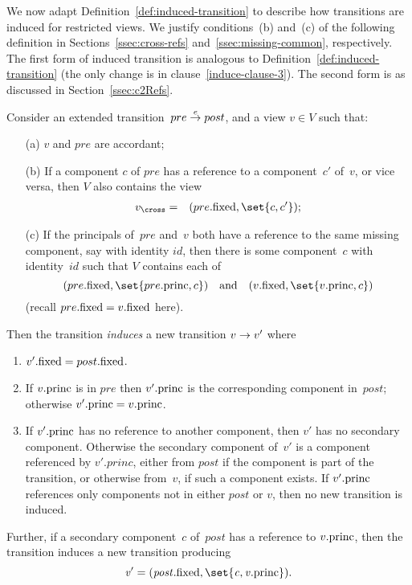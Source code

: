 We now adapt Definition~\ref{def:induced-transition} to describe how
transitions are induced for restricted views.  We justify conditions~(b)
and~(c) of the following definition in Sections~\ref{ssec:cross-refs}
and~\ref{ssec:missing-common}, respectively.  The first form of induced
transition is analogous to Definition~\ref{def:induced-transition} (the only
change is in clause~\ref{induce-clause-3}).  The second form is as discussed
in Section~\ref{ssec:c2Refs}.
%
\begin{definition}
\label{def:induced-transition-singleRef}
Consider an extended transition~$pre \stackrel{e}\rightarrow post$, and a view $v \in V$
such that:
%
\begin{enumerate}
\item[(a)] $v$ and $pre$ are accordant;

\item[(b)] If a component $c$ of $pre$ has a reference
  to a component~$c'$ of~$v$, or vice versa, then $V$ also contains the view
\begin{eqnarray*}
v_\cross & = & (pre.\fixed, \set{c, c'});
\end{eqnarray*}

\item[(c)] If the principals of~$pre$ and~$v$ both have a reference to the
  same missing component, say with identity $id$, then there is some
  component~$c$ with identity~$id$ such that $V$ contains each of
\[
(pre.\fixed, \set{pre.\princ, c}) \quad\mbox{and}\quad 
(v.\fixed, \set{v.\princ, c})
\]
(recall $pre.\mathrm{fixed} = v.\mathrm{fixed}$ here).
\end{enumerate}
%
Then the transition \emph{induces} a new
transition $v \stackrel{}\rightarrow v'$ where
\begin{enumerate}
\item $v'.\mathrm{fixed} = post.\mathrm{fixed}$.

\item If $v.\mathrm{princ}$ is in $pre$ then $v'.\mathrm{princ}$ is the corresponding
  component in~$post$; otherwise $v'.\mathrm{princ} = v.\mathrm{princ}$.

\item\label{induce-clause-3} If $v'.\mathrm{princ}$ has no reference to another
  component, then $v'$ has no secondary component.  Otherwise the secondary
  component of~$v'$ is a component referenced by $v'.princ$, either from
  $post$ if the component is part of the transition, or otherwise from~$v$, if
  such a component exists.  If $v'.\mathrm{princ}$ references only components not in
  either $post$ or $v$, then no new transition is induced.
\end{enumerate}
%
Further, if a secondary component~$c$ of~$post$ has a reference to $v.\mathrm{princ}$,
then the transition induces a new transition producing
\[\mit
v' = (post.\fixed, \set{c, v.\princ}).
\]
\end{definition}

